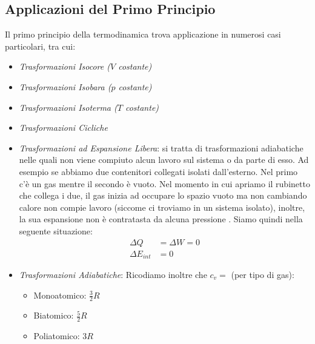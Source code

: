         \subsection{Applicazioni del Primo Principio} Il primo principio della 
        termodinamica trova applicazione in numerosi casi particolari, tra cui:
            \begin{itemize}
                \item \textit{Trasformazioni Isocore ($V$ costante)}
                \item \textit{Trasformazioni Isobara ($p$ costante)}

                \item \textit{Trasformazioni Isoterma ($T$ costante)}
                \item \textit{Trasformazioni Cicliche}
                \item \textit{Trasformazioni ad Espansione Libera}: si tratta 
                        di trasformazioni adiabatiche nelle quali non viene 
                        compiuto alcun lavoro sul sistema o da parte di esso.
                        Ad esempio se abbiamo due contenitori collegati isolati 
                        dall'esterno. Nel primo c'è un gas mentre il secondo è
                        vuoto. Nel momento in cui apriamo il rubinetto che 
                        collega i due, il gas inizia ad occupare lo spazio 
                        vuoto ma non cambiando calore non compie lavoro 
                        (siccome ci troviamo in un sistema isolato), inoltre,
                        la sua espansione non è contratasta da alcuna pressione
                        . Siamo quindi nella seguente situazione:
                        \begin{align*}
                            \Delta Q &= \Delta W = 0 \\
                            \Delta E_{int} &= 0
                        \end{align*}
                        
                \item \textit{Trasformazioni Adiabatiche}:
                        Ricodiamo inoltre che $c_v = $ (per tipo di gas):
                        \begin{itemize}
                            \item Monoatomico: $\frac{3}{2} R$
                            \item Biatomico: $\frac{5}{2} R$
                            \item Poliatomico: $3 R$
                        \end{itemize}
            \end{itemize}


